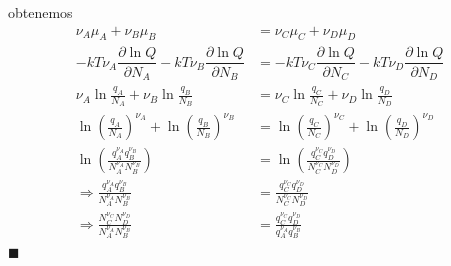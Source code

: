\documentclass[]{article}
\numberwithin{equation}{section}
\newcommand{\0}{\textcolor{gray}{0}}
\newcommand{\pd}[2]{\dfrac{\partial #1}{\partial #2}}
\newcommand{\qed}{\hfill\(\blacksquare\)}
\begin{document}
obtenemos
\begin{align}
	\nu_A\mu_A + \nu_B\mu_B &= \nu_C\mu_C + \nu_D\mu_D \nonumber\\
	-kT \nu_A \pd{\ln Q}{N_A} - kT \nu_B \pd{\ln Q}{N_B} &= - kT \nu_C \pd{\ln Q}{N_C} - kT \nu_D \pd{\ln Q}{N_D} \nonumber\\
	\nu_A\ln\frac{q_A}{N_A} + \nu_B\ln\frac{q_B}{N_B} &= \nu_C\ln\frac{q_C}{N_C} + \nu_D\ln\frac{q_D}{N_D} \nonumber\\
	\ln\left(\frac{q_A}{N_A}\right)^{\nu_A} + \ln\left(\frac{q_B}{N_B}\right)^{\nu_B} &= \ln\left(\frac{q_C}{N_C}\right)^{\nu_C} + \ln\left(\frac{q_D}{N_D}\right)^{\nu_D} \nonumber\\
	\ln\left(\frac{q_A^{\nu_A} q_B^{\nu_B}}{N_A^{\nu_A} N_B^{\nu_B}}\right) &= \ln\left(\frac{q_C^{\nu_C} q_D^{\nu_D}}{N_C^{\nu_C} N_D^{\nu_D}}\right) \nonumber\\
	\Rightarrow \frac{q_A^{\nu_A} q_B^{\nu_B}}{N_A^{\nu_A} N_B^{\nu_B}} &= \frac{q_C^{\nu_C} q_D^{\nu_D}}{N_C^{\nu_C} N_D^{\nu_D}} \nonumber\\
	\Rightarrow \frac{N_C^{\nu_C} N_D^{\nu_D}}{N_A^{\nu_A} N_B^{\nu_B}} &= \frac{q_C^{\nu_C} q_D^{\nu_D}}{q_A^{\nu_A} q_B^{\nu_B}}
\end{align}
\qed

\end{document}
